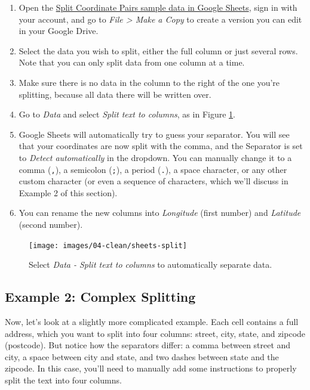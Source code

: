 \documentclass[
  english,
]{book}
\begin{document}
\begin{enumerate}
\def\labelenumi{\arabic{enumi}.}
\item
  Open the \href{https://docs.google.com/spreadsheets/d/1VmY9aS7I7UstXeI2xsJ-Ep2Q0CW8tnFHWTCga4EaJRk/edit\#gid=1670822958}{Split Coordinate Pairs sample data in Google Sheets}, sign in with your account, and go to \emph{File \textgreater{} Make a Copy} to create a version you can edit in your Google Drive.
\item
  Select the data you wish to split, either the full column or just several rows.
  Note that you can only split data from one column at a time.
\item
  Make sure there is no data in the column to the right of the one you're splitting, because
  all data there will be written over.
\item
  Go to \emph{Data} and select \emph{Split text to columns}, as in Figure \ref{fig:sheets-split}.
\item
  Google Sheets will automatically try to guess your separator. You will see that your coordinates
  are now split with the comma, and the Separator is set to \emph{Detect automatically} in the dropdown.
  You can manually change it to a comma (\texttt{,}), a semicolon (\texttt{;}), a period (\texttt{.}), a space character,
  or any other custom character (or even a sequence of characters, which we'll discuss in Example 2 of this section).
\item
  You can rename the new columns into \emph{Longitude} (first number) and \emph{Latitude} (second number).
\end{enumerate}



\begin{figure}
\texttt{[image: images/04-clean/sheets-split]} \caption{Select \emph{Data - Split text to columns} to automatically separate data.}\label{fig:sheets-split}
\end{figure}

\hypertarget{example-2-complex-splitting}{%
\subsection*{Example 2: Complex Splitting}\label{example-2-complex-splitting}}

Now, let's look at a slightly more complicated example. Each cell contains a full address, which you want to split into four columns: street, city, state, and zipcode (postcode). But notice how the separators differ: a comma between street and city, a space between city and state, and two dashes between state and the zipcode. In this case, you'll need to manually add some instructions to properly split the text into four columns.
\end{document}
